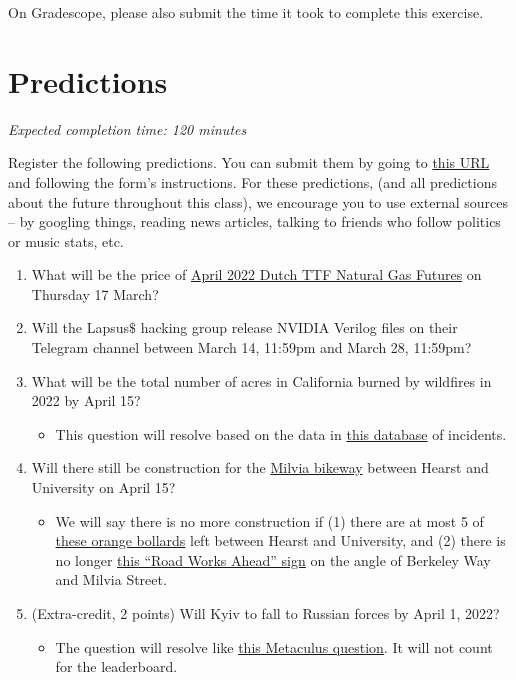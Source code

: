 \documentclass[11pt]{article}
\begin{document}
On Gradescope, please also submit the time it took to complete this exercise.


\section*{Predictions}

\emph{Expected completion time: 120 minutes}

Register the following predictions. You can submit them by going to \href{https://docs.google.com/forms/d/e/1FAIpQLSceQC49WmqDIG0Y9E-O7aTNcfS-hGP_HMg5Qem4W1F5-pt8QQ/viewform?usp=sf_link}{this URL} and following the form's instructions. For these predictions, (and all predictions about the future throughout this class), we encourage you to use external sources -- by googling things, reading news articles, talking to friends who follow politics or music stats, etc.

\begin{enumerate}
	\item What will be the price of \href{https://www.theice.com/products/27996665/Dutch-TTF-Gas-Futures/data?marketId=5360399&span=1}{April 2022 Dutch TTF Natural Gas Futures} on Thursday 17 March?
	\item Will the Lapsus$\$$ hacking group release NVIDIA Verilog files on their Telegram channel between March 14, 11:59pm and March 28, 11:59pm?
	\item What will be the total number of acres in California burned by wildfires in 2022 by April 15?
	\begin{itemize}
		\item This question will resolve based on the data in \href{https://www.fire.ca.gov/incidents/2022/}{this database} of incidents.
	\end{itemize}
	\item Will there still be construction for the \href{https://www.berkeleyside.org/2021/07/07/milvia-street-berkeley-construction-bike-lanes}{Milvia bikeway} between Hearst and University on April 15?
	\begin{itemize}
		\item We will say there is no more construction if (1) there are at most 5 of \href{https://drive.google.com/file/d/1lnhlF9xAOJ5u1CbSyMmXPxyTUJtdXxue/view?usp=sharing}{these orange bollards} left between Hearst and University, and (2) there is no longer \href{https://drive.google.com/file/d/12rqYnh4DPwEApKft4acDz9lzGxiLPkzr/view?usp=sharing}{this ``Road Works Ahead'' sign} on the angle of Berkeley Way and Milvia Street.
	\end{itemize}
	\item (Extra-credit, 2 points) Will Kyiv to fall to Russian forces by April 1, 2022?
	\begin{itemize}
		\item The question will resolve like \href{https://www.metaculus.com/questions/9939/kyiv-to-fall-to-russian-forces-by-april-2022/}{this Metaculus question}. It will not count for the leaderboard.
	\end{itemize}
\end{enumerate}
\end{document}
